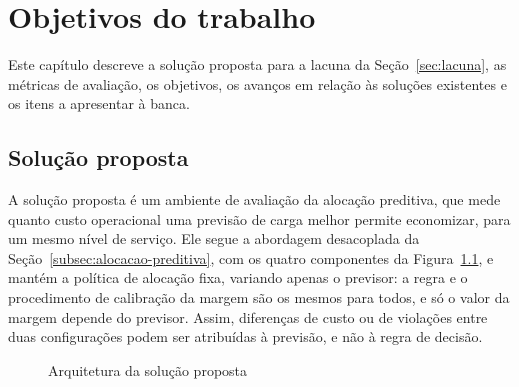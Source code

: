 \chapter{Objetivos do trabalho}
\label{cap:objetivos}

\makeatletter
\newcommand{\oelabel}[2]{\textbf{#1}\def\@currentlabel{#1}\label{#2}}
\makeatother

Este capítulo descreve a solução proposta para a lacuna da Seção~\ref{sec:lacuna}, as métricas de avaliação, os objetivos, os avanços em relação às soluções existentes e os itens a apresentar à banca.

\section{Solução proposta}
\label{sec:solucao}

A solução proposta é um ambiente de avaliação da alocação preditiva, que mede quanto custo operacional uma previsão de carga melhor permite economizar, para um mesmo nível de serviço. Ele segue a abordagem desacoplada da Seção~\ref{subsec:alocacao-preditiva}, com os quatro componentes da Figura~\ref{fig:arquitetura}, e mantém a política de alocação fixa, variando apenas o previsor: a regra e o procedimento de calibração da margem são os mesmos para todos, e só o valor da margem depende do previsor. Assim, diferenças de custo ou de violações entre duas configurações podem ser atribuídas à previsão, e não à regra de decisão.

\begin{figure}[htbp]
\centering
\caption{Arquitetura da solução proposta}
\label{fig:arquitetura}
\end{figure}

